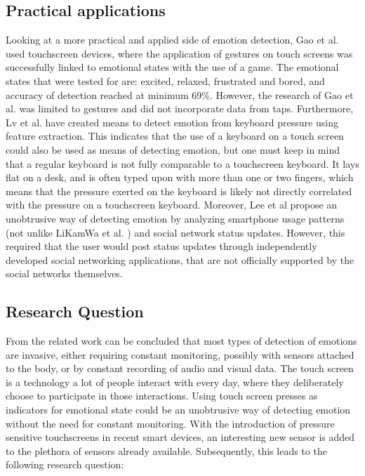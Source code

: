 \documentclass{sig-alternate}
\begin{document}
\subsection{Practical applications} %
\label{sub:practical_applications}
Looking at a more practical and applied side of emotion detection, Gao et al. \cite{Gao2012} used touchscreen devices, where the application of gestures on touch screens was successfully linked to emotional states with the use of a game. The emotional states that were tested for are: excited, relaxed, frustrated and bored, and accuracy of detection reached at minimum 69\%. However, the research of Gao et al. was limited to gestures and did not incorporate data from taps. Furthermore, Lv et al. \cite{H.R.LvZ.L.LinW.J.Yin2008} have created means to detect emotion from keyboard pressure using feature extraction. This indicates that the use of a keyboard on a touch screen could also be used as means of detecting emotion, but one must keep in mind that a regular keyboard is not fully comparable to a touchscreen keyboard. It lays flat on a desk, and is often typed upon with more than one or two fingers, which means that the pressure exerted on the keyboard is likely not directly correlated with the pressure on a touchscreen keyboard. Moreover, Lee et al \cite{Lee2012} propose an unobtrusive way of detecting emotion by analyzing smartphone usage patterns (not unlike LiKamWa et al. \cite{Likamwa2013}) and social network status updates. However, this required that the user would post status updates through independently developed social networking applications, that are not officially supported by the social networks themselves.


\subsection{Research Question}
From the related work can be concluded that most types of detection of emotions are invasive, either requiring constant monitoring, possibly with sensors attached to the body, or by constant recording of audio and visual data. The touch screen is a technology a lot of people interact with every day, where they deliberately choose to participate in those interactions. Using touch screen presses as indicators for emotional state could be an unobtrusive way of detecting emotion without the need for constant monitoring. With the introduction of pressure sensitive touchscreens in recent smart devices, an interesting new sensor is added to the plethora of sensors already available. Subsequently, this leads to the following research question:\\
\end{document}
